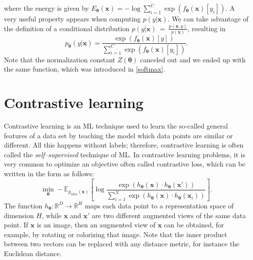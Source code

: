 where the energy is given by $E_{\boldsymbol{\theta}}(\boldsymbol{x}) = -\log\sum_{i=1}^C\exp\left({f_{\boldsymbol{\theta}}\left(\boldsymbol{x}\right)[y_i]}\right)$. A very useful property appears when computing $p(y|\boldsymbol{x})$. We can take advantage of the definition of a conditional distribution $p(y|\boldsymbol{x})~=~\frac{p\left(\boldsymbol{x},y\right)}{p\left(\boldsymbol{x}\right)}$, resulting in  
\begin{equation}\label{softmaxdef}
	p_{\boldsymbol{\theta}}\left(y|\boldsymbol{x}\right) = \frac{\exp\left({f_{\boldsymbol{\theta}}\left(\boldsymbol{x}\right)[y]}\right)}{\sum_{i=1}^C\exp\left({f_{\boldsymbol{\theta}}\left(\boldsymbol{x}\right)[y_i]}\right)}.
\end{equation}
Note that the normalization constant $Z(\boldsymbol{\theta})$ canceled out and we ended up with the same function, which was introduced in \eqref{softmax}. 
\section{Contrastive learning}
 Contrastive learning \cite{contrastive1, contrastive2} is an ML technique used to learn the so-called general features of a data set by teaching the model which data points are similar or different. All this happens without labels; therefore, contrastive learning is often called the \emph{self--supervised} technique of ML.  In contrastive learning problems, it is very common to optimize an objective often called contrastive loss, which can be written in the form as follows:
\begin{equation}\label{eq:contrastive}
	\min_{\boldsymbol{\theta}}- \mathbb{E}_{p_{\mathrm{data}}(\boldsymbol{x})}\left[\log \frac{\exp\left({h_{\boldsymbol{\theta}}\left(\boldsymbol{x}\right)\cdot h_{\boldsymbol{\theta}}\left(\boldsymbol{x}'\right)}\right)}{\sum_{i=1}^N\exp\left({h_{\boldsymbol{\theta}}\left(\boldsymbol{x}\right)\cdot h_{\boldsymbol{\theta}}(\boldsymbol{x}_i) }\right)} \right].
\end{equation}
The function $h_{\boldsymbol{\theta}}: \mathbb{R}^D \to \mathbb{R}^H$ maps each data point to a representation space of dimension $H$, while $\boldsymbol{x}$ and $\boldsymbol{x}'$ are two different augmented views of the same data point. If $\boldsymbol{x}$ is an image, then an augmented view of $\boldsymbol{x}$ can be obtained, for example, by rotating or colorizing that image. Note that the inner product between two vectors can be replaced with any distance metric, for instance the Euclidean distance. 

